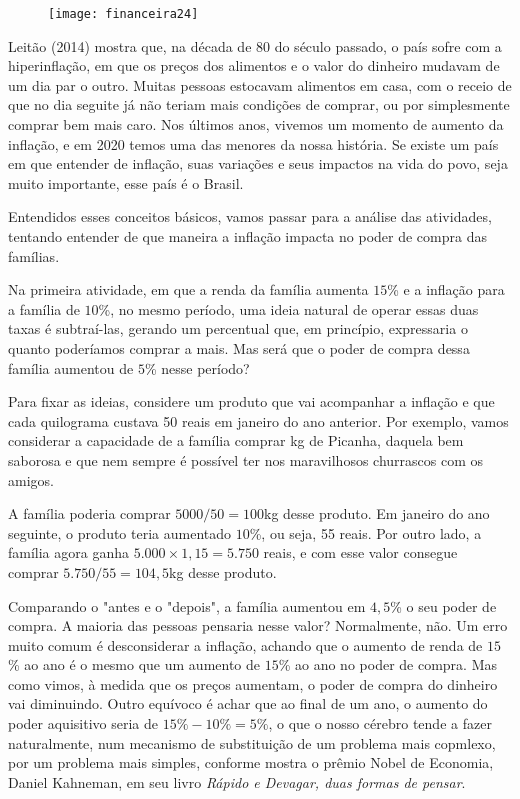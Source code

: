 \begin{observation}{}
\begin{figure}
\texttt{[image: financeira24]}
\end{figure}

Leitão (2014) mostra que, na década de 80 do século passado, o país sofre com a hiperinflação, em que os preços dos alimentos e o valor do dinheiro mudavam de um dia par o outro. Muitas pessoas estocavam alimentos em casa, com o receio de que no dia seguite já não teriam mais condições de comprar, ou por simplesmente comprar bem mais caro. Nos últimos anos, vivemos um momento de aumento da inflação, e em 2020 temos uma das menores da nossa história. Se existe um país em que entender de inflação, suas variações e seus impactos na vida do povo, seja muito importante, esse país é o Brasil.
\end{observation}

Entendidos esses conceitos básicos, vamos passar para a análise das atividades, tentando entender de que maneira a inflação impacta no poder de compra das famílias.

Na primeira atividade, em que a renda da família aumenta $15$\% e a inflação para a família de $10$\%, no mesmo período, uma ideia natural de operar essas duas taxas é subtraí-las, gerando um percentual que, em princípio, expressaria o quanto poderíamos comprar a mais. Mas será que o poder de compra dessa família aumentou de $5$\% nesse período?

Para fixar as ideias, considere um produto que vai acompanhar a inflação e que cada quilograma custava 50 reais em janeiro do ano anterior. Por exemplo, vamos considerar a capacidade de a família comprar kg de Picanha, daquela bem saborosa e que nem sempre é possível ter nos maravilhosos churrascos com os amigos.

A família poderia comprar $5000/50=100$kg desse produto. Em janeiro do ano seguinte, o produto teria aumentado $10$\%, ou seja, 55 reais. Por outro lado, a família agora ganha $5.000\times1{,}15=5.750$ reais, e com esse valor consegue comprar $5.750/55=104{,}5$kg desse produto.

Comparando o "antes e o "depois", a família aumentou em $4{,}5$\% o seu poder de compra. A maioria das pessoas pensaria nesse valor? Normalmente, não.  Um erro muito comum é desconsiderar a inflação, achando que o aumento de renda de $15$\% ao ano é o mesmo que um aumento de $15$\% ao ano no poder de compra. Mas como vimos, à medida que os preços aumentam, o poder de compra do dinheiro vai diminuindo. Outro equívoco é achar que ao final de um ano, o aumento do poder aquisitivo seria de $15\%-10\%=5\%$, o que o nosso cérebro tende a fazer naturalmente, num mecanismo de substituição de um problema mais copmlexo, por um problema mais simples, conforme mostra o prêmio Nobel de Economia, Daniel Kahneman, em seu livro \textit{Rápido e Devagar, duas formas de pensar}.

